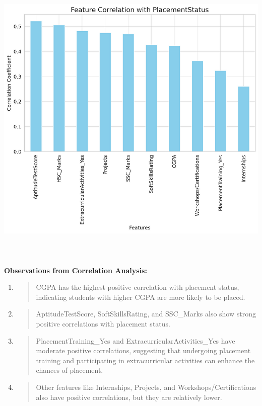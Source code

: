 \documentclass[]{article}
\begin{document}
\includegraphics[width=5.26806in,height=5.6875in]{image7.png}

\textbf{Observations from Correlation Analysis:}

\begin{enumerate}
\def\labelenumi{\arabic{enumi}.}
\item
  \begin{quote}
  CGPA has the highest positive correlation with placement status,
  indicating students with higher CGPA are more likely to be placed.
  \end{quote}
\item
  \begin{quote}
  AptitudeTestScore, SoftSkillsRating, and SSC\_Marks also show strong
  positive correlations with placement status.
  \end{quote}
\item
  \begin{quote}
  PlacementTraining\_Yes and ExtracurricularActivities\_Yes have
  moderate positive correlations, suggesting that undergoing placement
  training and participating in extracurricular activities can enhance
  the chances of placement.
  \end{quote}
\item
  \begin{quote}
  Other features like Internships, Projects, and
  Workshops/Certifications also have positive correlations, but they are
  relatively lower.
  \end{quote}
\end{enumerate}
\end{document}
